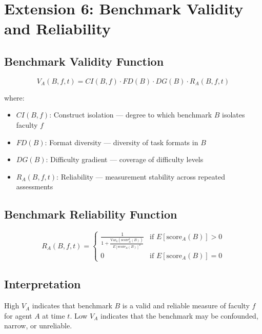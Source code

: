 \documentclass[11pt,a4paper]{article}
\begin{document}
\section{Extension 6: Benchmark Validity and Reliability}\label{app:validity}

\subsection{Benchmark Validity Function}

\begin{equation}\label{app:eq:validity-function}
V_A(B,f,t) = CI(B,f) \cdot FD(B) \cdot DG(B) \cdot R_A(B,f,t)
\end{equation}

where:
\begin{itemize}[nosep]
\item $CI(B,f)$: Construct isolation --- degree to which benchmark $B$ isolates faculty $f$
\item $FD(B)$: Format diversity --- diversity of task formats in $B$
\item $DG(B)$: Difficulty gradient --- coverage of difficulty levels
\item $R_A(B,f,t)$: Reliability --- measurement stability across repeated assessments
\end{itemize}

\subsection{Benchmark Reliability Function}

\begin{equation}\label{app:eq:reliability}
R_A(B,f,t) = \begin{cases}
\displaystyle\frac{1}{1 + \frac{\text{Var}_k(\text{score}_A^k(B))}{E[\text{score}_A(B)]^2}} & \text{if } E[\text{score}_A(B)] > 0 \\[8pt]
0 & \text{if } E[\text{score}_A(B)] = 0
\end{cases}
\end{equation}

\subsection{Interpretation}

High $V_A$ indicates that benchmark $B$ is a valid and reliable measure
of faculty $f$ for agent $A$ at time $t$. Low $V_A$ indicates that the
benchmark may be confounded, narrow, or unreliable.
\end{document}
